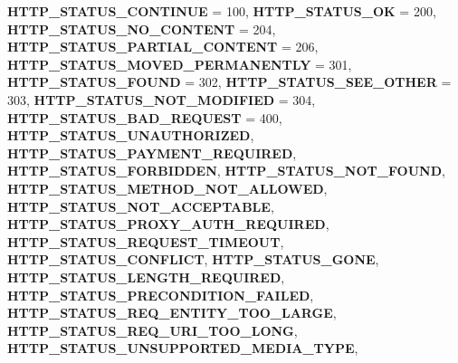 \begin{DoxyCompactItemize}
\newline
{\bfseries H\+T\+T\+P\+\_\+\+S\+T\+A\+T\+U\+S\+\_\+\+C\+O\+N\+T\+I\+N\+UE} = 100, 
{\bfseries H\+T\+T\+P\+\_\+\+S\+T\+A\+T\+U\+S\+\_\+\+OK} = 200, 
{\bfseries H\+T\+T\+P\+\_\+\+S\+T\+A\+T\+U\+S\+\_\+\+N\+O\+\_\+\+C\+O\+N\+T\+E\+NT} = 204, 
{\bfseries H\+T\+T\+P\+\_\+\+S\+T\+A\+T\+U\+S\+\_\+\+P\+A\+R\+T\+I\+A\+L\+\_\+\+C\+O\+N\+T\+E\+NT} = 206, 
\newline
{\bfseries H\+T\+T\+P\+\_\+\+S\+T\+A\+T\+U\+S\+\_\+\+M\+O\+V\+E\+D\+\_\+\+P\+E\+R\+M\+A\+N\+E\+N\+T\+LY} = 301, 
{\bfseries H\+T\+T\+P\+\_\+\+S\+T\+A\+T\+U\+S\+\_\+\+F\+O\+U\+ND} = 302, 
{\bfseries H\+T\+T\+P\+\_\+\+S\+T\+A\+T\+U\+S\+\_\+\+S\+E\+E\+\_\+\+O\+T\+H\+ER} = 303, 
{\bfseries H\+T\+T\+P\+\_\+\+S\+T\+A\+T\+U\+S\+\_\+\+N\+O\+T\+\_\+\+M\+O\+D\+I\+F\+I\+ED} = 304, 
\newline
{\bfseries H\+T\+T\+P\+\_\+\+S\+T\+A\+T\+U\+S\+\_\+\+B\+A\+D\+\_\+\+R\+E\+Q\+U\+E\+ST} = 400, 
{\bfseries H\+T\+T\+P\+\_\+\+S\+T\+A\+T\+U\+S\+\_\+\+U\+N\+A\+U\+T\+H\+O\+R\+I\+Z\+ED}, 
{\bfseries H\+T\+T\+P\+\_\+\+S\+T\+A\+T\+U\+S\+\_\+\+P\+A\+Y\+M\+E\+N\+T\+\_\+\+R\+E\+Q\+U\+I\+R\+ED}, 
{\bfseries H\+T\+T\+P\+\_\+\+S\+T\+A\+T\+U\+S\+\_\+\+F\+O\+R\+B\+I\+D\+D\+EN}, 
\newline
{\bfseries H\+T\+T\+P\+\_\+\+S\+T\+A\+T\+U\+S\+\_\+\+N\+O\+T\+\_\+\+F\+O\+U\+ND}, 
{\bfseries H\+T\+T\+P\+\_\+\+S\+T\+A\+T\+U\+S\+\_\+\+M\+E\+T\+H\+O\+D\+\_\+\+N\+O\+T\+\_\+\+A\+L\+L\+O\+W\+ED}, 
{\bfseries H\+T\+T\+P\+\_\+\+S\+T\+A\+T\+U\+S\+\_\+\+N\+O\+T\+\_\+\+A\+C\+C\+E\+P\+T\+A\+B\+LE}, 
{\bfseries H\+T\+T\+P\+\_\+\+S\+T\+A\+T\+U\+S\+\_\+\+P\+R\+O\+X\+Y\+\_\+\+A\+U\+T\+H\+\_\+\+R\+E\+Q\+U\+I\+R\+ED}, 
\newline
{\bfseries H\+T\+T\+P\+\_\+\+S\+T\+A\+T\+U\+S\+\_\+\+R\+E\+Q\+U\+E\+S\+T\+\_\+\+T\+I\+M\+E\+O\+UT}, 
{\bfseries H\+T\+T\+P\+\_\+\+S\+T\+A\+T\+U\+S\+\_\+\+C\+O\+N\+F\+L\+I\+CT}, 
{\bfseries H\+T\+T\+P\+\_\+\+S\+T\+A\+T\+U\+S\+\_\+\+G\+O\+NE}, 
{\bfseries H\+T\+T\+P\+\_\+\+S\+T\+A\+T\+U\+S\+\_\+\+L\+E\+N\+G\+T\+H\+\_\+\+R\+E\+Q\+U\+I\+R\+ED}, 
\newline
{\bfseries H\+T\+T\+P\+\_\+\+S\+T\+A\+T\+U\+S\+\_\+\+P\+R\+E\+C\+O\+N\+D\+I\+T\+I\+O\+N\+\_\+\+F\+A\+I\+L\+ED}, 
{\bfseries H\+T\+T\+P\+\_\+\+S\+T\+A\+T\+U\+S\+\_\+\+R\+E\+Q\+\_\+\+E\+N\+T\+I\+T\+Y\+\_\+\+T\+O\+O\+\_\+\+L\+A\+R\+GE}, 
{\bfseries H\+T\+T\+P\+\_\+\+S\+T\+A\+T\+U\+S\+\_\+\+R\+E\+Q\+\_\+\+U\+R\+I\+\_\+\+T\+O\+O\+\_\+\+L\+O\+NG}, 
{\bfseries H\+T\+T\+P\+\_\+\+S\+T\+A\+T\+U\+S\+\_\+\+U\+N\+S\+U\+P\+P\+O\+R\+T\+E\+D\+\_\+\+M\+E\+D\+I\+A\+\_\+\+T\+Y\+PE}, 

\end{DoxyCompactItemize}
